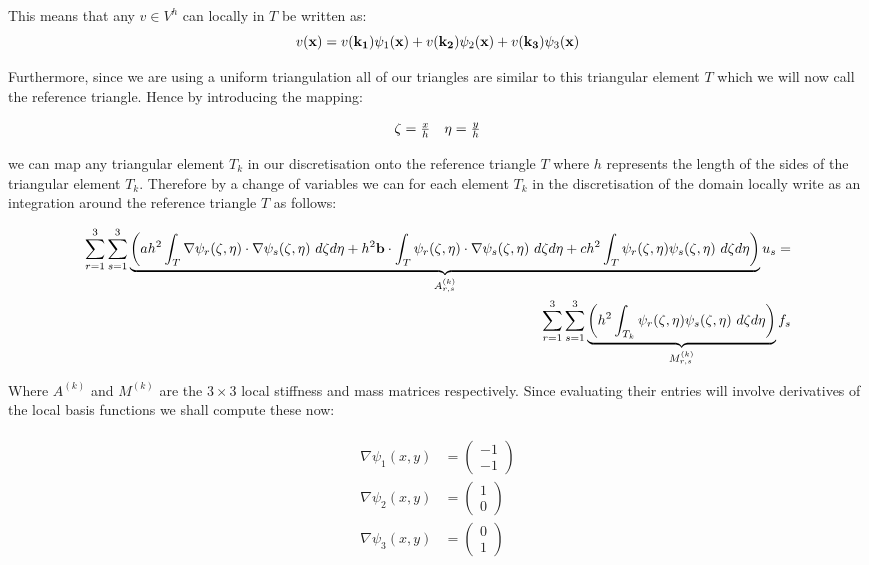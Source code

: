 This means that any $v \in V^h$ can locally in $T$ be written as:
\[
    v(\mathbf{x}) = v(\mathbf{k_1})\psi_1(\mathbf{x}) + v(\mathbf{k_2})\psi_2(\mathbf{x}) + v(\mathbf{k_3})\psi_3(\mathbf{x})
\]

Furthermore, since we are using a uniform triangulation all of our triangles
are similar to this triangular element $T$ which we will now call the reference
triangle. Hence by introducing the mapping:

\begin{align*}
 \begin{array}{c c}
    \zeta = \frac{x}{h} & \eta = \frac{y}{h}
 \end{array}
\end{align*}

we can map any triangular element $T_k$ in our discretisation onto the reference
triangle $T$ where $h$ represents the length of the sides of the triangular
element $T_k$. Therefore by a change of variables we can for each element $T_k$ in the discretisation of the
domain locally write  as an integration around the reference
triangle $T$ as follows:

\begin{align}\label{eq:twod-deterministic-discrete-local}
    \begin{split}
    \sum_{r=1}^3\sum_{s=1}^3\underbrace{
      \left(
        ah^2\int_{T}\nabla\psi_r(\zeta, \eta)\cdot\nabla\psi_s(\zeta, \eta)\ d\zeta d\eta
        + h^2\mathbf{b} \cdot \int_{T}\psi_r(\zeta,\eta)\cdot\nabla\psi_s(\zeta,\eta)\ d\zeta d\eta
        + ch^2\int_{T}\psi_r(\zeta,\eta)\psi_s(\zeta,\eta)\ d\zeta d\eta
      \right)}_{A^{(k)}_{r,s}}u_s = \\
    \sum_{r=1}^3\sum_{s=1}^3\underbrace{\left(
        h^2\int_{T_k}\psi_r(\zeta,\eta)\psi_s(\zeta,\eta)\ d\zeta d\eta
    \right)}_{M^{(k)}_{r,s}}f_s
    \end{split}
\end{align}

Where $A^{(k)}$ and $M^{(k)}$ are the $3 \times 3$ local stiffness and mass
matrices respectively. Since evaluating their entries will involve derivatives
of the local basis functions we shall compute these now:

\begin{align}
    \begin{split}
        \nabla\psi_1(x, y) &= \left(\begin{array}{c} -1 \\ -1 \end{array}\right) \\
        \nabla\psi_2(x, y) &= \left(\begin{array}{c} 1 \\ 0 \end{array}\right) \\
        \nabla\psi_3(x, y) &= \left(\begin{array}{c} 0 \\ 1 \end{array}\right)
    \end{split}
\end{align}

